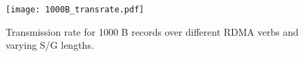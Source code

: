 \begin{figure}[t]
\texttt{[image: 1000B\_transrate.pdf]}
\caption{Transmission rate for 1000 B records over different RDMA verbs and 
varying S/G lengths.}
\label{fig:1000B_transrate}
\end{figure}

